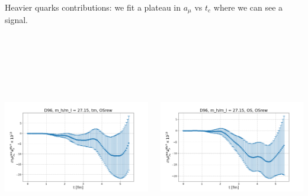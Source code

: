 \documentclass[xcolor={dvipsnames,table}]{beamer}
\begin{document}
\begin{frame}
  Heavier quarks contributions: we fit a plateau in $a_\mu$ vs $t_c$ where we can see a signal.
  \vfill \,

  \

  \

  \

  \begin{columns}
    \begin{column}{0.5\textwidth}
      \includegraphics[trim=0cm 0.3cm 0cm 1.2cm, clip,width=\textwidth]{plots/der_mq_sea_lore/amu_D96_tm_der_027ml.png}
    \end{column}
    \begin{column}{0.5\textwidth}
      \includegraphics[trim=0cm 0.3cm 0cm 1.2cm, clip,width=\textwidth]{plots/der_mq_sea_lore/amu_D96_OS_der_027ml.png}
    \end{column}
  \end{columns}
  \

  \

  \

  \
\end{frame}
\end{document}
